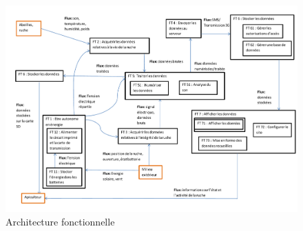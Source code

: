 \begin{figure}[h]
\centering\includegraphics[scale=0.7]{analyseFonctionelle.pdf}
\caption{\label{fig:anaFonc} Architecture fonctionnelle}
\end{figure}    

